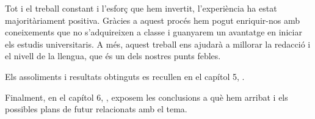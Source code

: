 Tot i el treball constant i l’esforç que hem invertit, l’experiència ha estat majoritàriament positiva. Gràcies a aquest procés hem pogut enriquir-nos amb coneixements que no s’adquireixen a classe i guanyarem un avantatge en iniciar els estudis universitaris. A més, aquest treball ens ajudarà a millorar la redacció i el nivell de la llengua, que és un dels nostres punts febles.

Els assoliments i resultats obtinguts es recullen en el capítol 5, .

Finalment, en el capítol 6, , exposem les conclusions a què hem arribat i els possibles plans de futur relacionats amb el tema.



